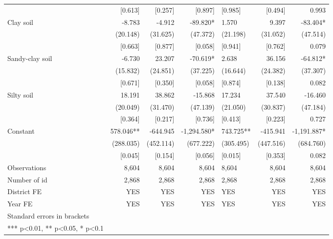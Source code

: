 \documentclass[
]{article}
\begin{document}
\begin{landscape}
\begin{ThreePartTable}
\begin{longtable}[t]{lrrrlrr}
 & {}[0.613] & {}[0.257] & {}[0.897] & {}[0.985] & {}[0.494] & 0.993\\
Clay soil & -8.783 & -4.912 & -89.820* & 1.570 & 9.397 & -83.404*\\
 & (20.148) & (31.625) & (47.372) & (21.198) & (31.052) & (47.514)\\
 & {}[0.663] & {}[0.877] & {}[0.058] & {}[0.941] & {}[0.762] & 0.079\\
Sandy-clay soil & -6.730 & 23.207 & -70.619* & 2.638 & 36.156 & -64.812*\\
 & (15.832) & (24.851) & (37.225) & (16.644) & (24.382) & (37.307)\\
 & {}[0.671] & {}[0.350] & {}[0.058] & {}[0.874] & {}[0.138] & 0.082\\
Silty soil & 18.191 & 38.862 & -15.868 & 17.234 & 37.540 & -16.460\\
 & (20.049) & (31.470) & (47.139) & (21.050) & (30.837) & (47.184)\\
 & {}[0.364] & {}[0.217] & {}[0.736] & {}[0.413] & {}[0.223] & 0.727\\
Constant & 578.046** & -644.945 & -1,294.580* & 743.725** & -415.941 & -1,191.887*\\
 & (288.035) & (452.114) & (677.222) & (305.495) & (447.516) & (684.760)\\
 & {}[0.045] & {}[0.154] & {}[0.056] & {}[0.015] & {}[0.353] & 0.082\\
Observations & 8,604 & 8,604 & 8,604 & 8,604 & 8,604 & 8,604\\
Number of id & 2,868 & 2,868 & 2,868 & 2,868 & 2,868 & 2,868\\
District FE & YES & YES & YES & YES & YES & YES\\
Year FE & YES & YES & YES & YES & YES & YES\\
Standard errors in brackets &  &  &  &  &  & \\
*** p<0.01, ** p<0.05, * p<0.1 &  &  &  &  &  & \\*
\end{longtable}
\end{ThreePartTable}
\endgroup{}
\end{landscape}

\newpage
\end{document}
